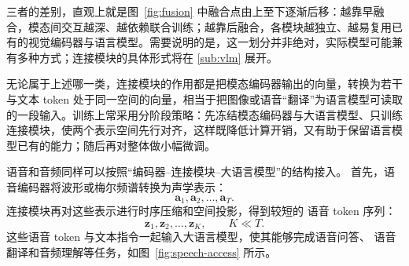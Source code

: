 三者的差别，直观上就是图~\ref{fig:fusion} 中融合点由上至下逐渐后移：越靠早融合，模态间交互越深、越依赖联合训练；越靠后融合，各模块越独立、越易复用已有的视觉编码器与语言模型。需要说明的是，这一划分并非绝对，实际模型可能兼有多种方式；连接模块的具体形式将在 \ref{sub:vlm} 展开。

无论属于上述哪一类，连接模块的作用都是把模态编码器输出的向量，转换为若干与文本 token 处于同一空间的向量，相当于把图像或语音“翻译”为语言模型可读取的一段输入。训练上常采用分阶段策略：先冻结模态编码器与大语言模型、只训练连接模块，使两个表示空间先行对齐，这样既降低计算开销，又有助于保留语言模型已有的能力；随后再对整体做小幅微调。


语音和音频同样可以按照“编码器--连接模块--大语言模型”的结构接入。
首先，语音编码器将波形或梅尔频谱转换为声学表示：
\[
\mathbf{a}_1,\mathbf{a}_2,\ldots,\mathbf{a}_T .
\]
连接模块再对这些表示进行时序压缩和空间投影，得到较短的
语音 token 序列：
\[
\mathbf{z}_1,\mathbf{z}_2,\ldots,\mathbf{z}_K,
\qquad K \ll T .
\]
这些语音 token 与文本指令一起输入大语言模型，使其能够完成语音问答、
语音翻译和音频理解等任务，如图~\ref{fig:speech-access} 所示。

